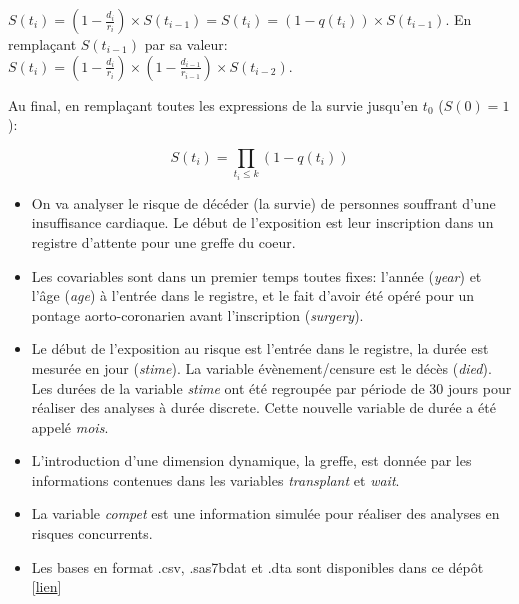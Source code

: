 \documentclass[
  12pt,
  letterpaper,
  DIV=11,
  numbers=noendperiod,
  onepage,
  openany]{scrreprt}
\begin{document}
\(S(t_i) = (1 - \frac{d_i}{r_i})\times{S(t_{i-1})} = S(t_i) = (1 - q(t_i))\times{S(t_{i-1})}\).
En remplaçant \(S(t_{i-1})\) par sa valeur:
\(S(t_i) = (1 - \frac{d_i}{r_i})\times(1 - \frac{d_{i-1}}{r_{i-1}})\times{S(t_{i-2})}\).

Au final, en remplaçant toutes les expressions de la survie jusqu'en
\(t_0\) (\(S(0)=1\)):

\[S(t_i)=\displaystyle \prod_{t_i\leq{k}} (1-q(t_i))\]

\begin{tcolorbox}[enhanced jigsaw, arc=.35mm, bottomrule=.15mm, titlerule=0mm, colbacktitle=quarto-callout-note-color!10!white, left=2mm, opacitybacktitle=0.6, toprule=.15mm, title=\textcolor{quarto-callout-note-color}{\faInfo}\hspace{0.5em}{Application pour la suite du support}, colframe=quarto-callout-note-color-frame, breakable, coltitle=black, opacityback=0, toptitle=1mm, bottomtitle=1mm, rightrule=.15mm, leftrule=.75mm, colback=white]

\begin{itemize}
\item
  On va analyser le risque de décéder (la survie) de personnes souffrant
  d'une insuffisance cardiaque. Le début de l'exposition est leur
  inscription dans un registre d'attente pour une greffe du coeur.
\item
  Les covariables sont dans un premier temps toutes fixes: l'année
  (\emph{year}) et l'âge (\emph{age}) à l'entrée dans le registre, et le
  fait d'avoir été opéré pour un pontage aorto-coronarien avant
  l'inscription (\emph{surgery}).
\item
  Le début de l'exposition au risque est l'entrée dans le registre, la
  durée est mesurée en jour (\emph{stime}). La variable
  évènement/censure est le décès (\emph{died}). Les durées de la
  variable \emph{stime} ont été regroupée par période de 30 jours pour
  réaliser des analyses à durée discrete. Cette nouvelle variable de
  durée a été appelé \emph{mois}.
\item
  L'introduction d'une dimension dynamique, la greffe, est donnée par
  les informations contenues dans les variables \emph{transplant} et
  \emph{wait}.
\item
  La variable \emph{compet} est une information simulée pour réaliser
  des analyses en risques concurrents.
\item
  Les bases en format .csv, .sas7bdat et .dta sont disponibles dans ce
  dépôt
  {[}\href{https://github.com/mthevenin/analyse_duree/tree/main/bases}{lien}{]}
\end{itemize}


\end{tcolorbox}
\end{document}
